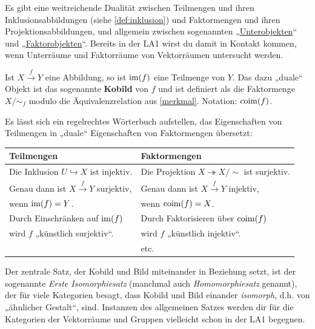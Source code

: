 \begin{vorschau} \label{teilmengenvsfaktormengen} 
    Es gibt eine weitreichende Dualität zwischen Teilmengen und ihren Inklusionsabbildungen (siehe \cref{def:inklusion}) und Faktormengen und ihren Projektionsabbildungen, und allgemein zwischen sogenannten „\href{https://ncatlab.org/nlab/show/subobject}{Unterobjekten}“ und „\href{https://ncatlab.org/nlab/show/quotient+object}{Faktorobjekten}“. Bereits in der LA1 wirst du damit in Kontakt kommen, wenn Unterräume und Faktorräume von Vektorräumen untersucht werden.
    
    Ist $X\xrightarrow{f} Y$ eine Abbildung, so ist $\operatorname{im}(f)$ eine Teilmenge von $Y$. Das dazu „duale“ Objekt ist das sogenannte \textbf{Kobild} von $f$ und ist definiert als die Faktormenge $X/{\sim_f}$ modulo die Äquivalenzrelation aus \cref{merkmal}. Notation: $\operatorname{coim}(f)$.
    
    Es lässt sich ein regelrechtes Wörterbuch aufstellen, das Eigenschaften von Teilmengen in „duale“ Eigenschaften von Faktormengen übersetzt:
    \begin{center}
    \begin{tabular}{ll}
    Teilmengen & Faktormengen \\
    \midrule
    Die Inklusion $U\hookrightarrow X$ ist injektiv. & Die Projektion $X\twoheadrightarrow X/{\sim}$ ist surjektiv. \\
    Genau dann ist $X\xrightarrow{f} Y$ surjektiv,  & Genau dann ist $X\xrightarrow{f} Y$ injektiv, \\
    \quad wenn $\operatorname{im}(f)=Y$. & \quad wenn $\operatorname{coim}(f)=X$. \\
    Durch Einschränken auf $\operatorname{im}(f)$ & Durch Faktorisieren über $\operatorname{coim}(f)$ \\
    \quad wird $f$ „künstlich surjektiv“.\footnotemark & \quad wird $f$ „künstlich injektiv“. \\
     & \hfill etc. 
    \end{tabular}
    \end{center}
    
    \noindent Der zentrale Satz, der Kobild und Bild miteinander in Beziehung setzt, ist der sogenannte \emph{Erste Isomorphiesatz} (manchmal auch \emph{Homomorphiesatz} genannt), der für viele Kategorien besagt, dass Kobild und Bild einander \emph{isomorph}, d.h. von „ähnlicher Gestalt“, sind. Instanzen des allgemeinen Satzes werden dir für die Kategorien der Vektorräume und Gruppen vielleicht schon in der LA1 begegnen.
\end{vorschau}


